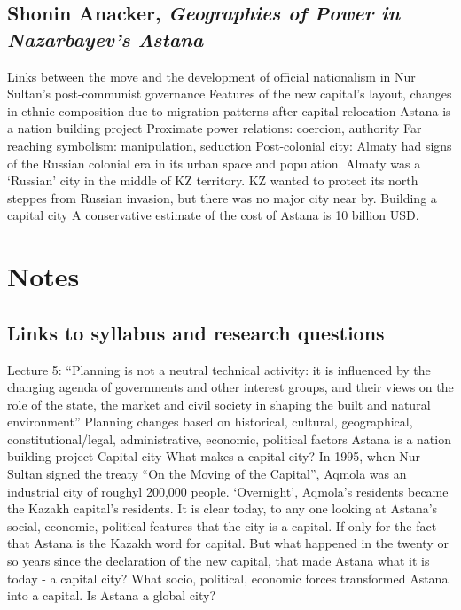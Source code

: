 \documentclass{article}
\begin{document}
\subsection{Shonin Anacker, \textit{Geographies of Power in Nazarbayev's Astana}}\cite{anacker2004geographies}

\begin{outline}
	\1 Links between the move and the development of official nationalism in Nur Sultan's post-communist governance 
	\1 Features of the new capital's layout, changes in ethnic composition due to migration patterns after capital relocation
	\1 Astana is a nation building project
		\2 Proximate power relations: coercion, authority
		\2 Far reaching symbolism: manipulation, seduction
	\1 Post-colonial city: Almaty had signs of the Russian colonial era in its urban space and population. Almaty was a `Russian' city in the middle of KZ territory. KZ wanted to protect its north steppes from Russian invasion, but there was no major city near by. 
	\1 Building a capital city
		\2 A conservative estimate of the cost of Astana is 10 billion USD. 
\end{outline}



\section{Notes}

\subsection{Links to syllabus and research questions}

\begin{outline}
	\1 Lecture 5: ``Planning is not a neutral technical activity: it is influenced by the changing agenda of governments and other interest groups, and their views on the role of the state, the market and civil society in shaping the built and natural environment''
		\2 Planning changes based on historical, cultural, geographical, constitutional/legal, administrative, economic, political factors
	\1 Astana is a nation building project
	\1 Capital city
		\2 What makes a capital city? In 1995, when Nur Sultan signed the treaty ``On the Moving of the Capital'', Aqmola was an industrial city of roughyl 200,000 people. `Overnight', Aqmola's residents became the Kazakh capital's residents. 
		\2 It is clear today, to any one looking at Astana's social, economic, political features that the city is a capital. If only for the fact that Astana is the Kazakh word for capital. But what happened in the twenty or so years since the declaration of the new capital, that made Astana what it is today - a capital city?
		\2 What socio, political, economic forces transformed Astana into a capital. Is Astana a global city?
\end{outline}
\end{document}
